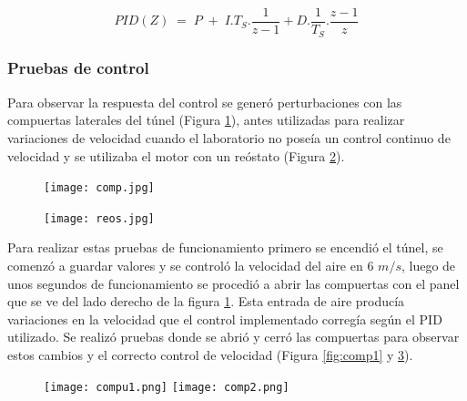      \begin{equation}
    PID(Z)\;=\;P\;+\;I.T_S.\frac1{z-1}+D.\frac1{T_S}.\frac{z-1}z \label{PIDZ}
    \end{equation}

\subsubsection{Pruebas de control}
Para observar la respuesta del control se generó perturbaciones con las compuertas laterales del túnel (Figura \ref{fig:comp}), antes utilizadas para realizar variaciones de velocidad\cite{barila1993desarrollo} cuando el laboratorio no poseía un control continuo de velocidad y se utilizaba el motor con un reóstato (Figura \ref{fig:reos}). 

\begin{figure}[H]
	\centering
	\texttt{[image: comp.jpg]}
	\label{fig:comp}
\end{figure}

\begin{figure}[H]
	\centering
	\texttt{[image: reos.jpg]}
	\label{fig:reos}
\end{figure}

Para realizar estas pruebas de funcionamiento primero se encendió el túnel, se comenzó a guardar valores y se controló la velocidad del aire en 6 $m/s$, luego de unos segundos de funcionamiento se procedió a abrir las compuertas con el panel que se ve del lado derecho de la figura \ref{fig:comp}. Esta entrada de aire producía variaciones en la velocidad que el control implementado corregía según el PID utilizado. Se realizó pruebas donde se abrió y cerró las compuertas para observar estos cambios y el correcto control de velocidad (Figura \ref{fig:comp1} y \ref{fig:comp2}).


\begin{figure}[H]
	\centering
	\texttt{[image: compu1.png]}
	\label{fig:comp1}
	\texttt{[image: comp2.png]}
	\label{fig:comp2}
\end{figure}



    \newpage
